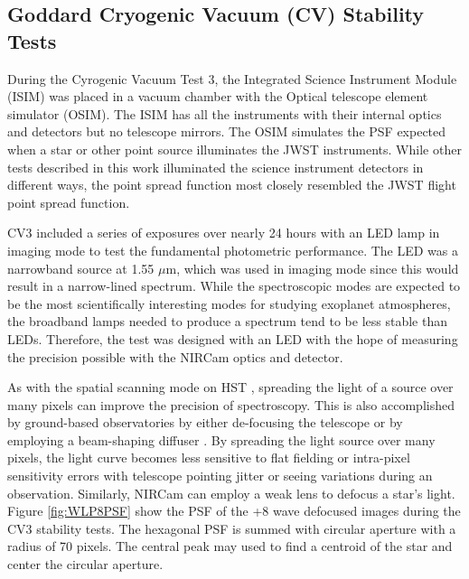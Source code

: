 \documentclass{aastex62}
\begin{document}
\subsection{Goddard Cryogenic Vacuum (CV) Stability Tests}

During the Cyrogenic Vacuum Test 3, the Integrated Science Instrument Module (ISIM) was placed in a vacuum chamber with the Optical telescope element simulator (OSIM).
The ISIM has all the instruments with their internal optics and detectors but no telescope mirrors.
The OSIM simulates the PSF expected when a star or other point source illuminates the JWST instruments.
While other tests described in this work illuminated the science instrument detectors in different ways, the point spread function most closely resembled the JWST flight point spread function.

CV3 included a series of exposures over nearly 24 hours with an LED lamp in imaging mode to test the fundamental photometric performance.
The LED was a narrowband source at 1.55 $\mu$m, which was used in imaging mode since this would result in a narrow-lined spectrum.
While the spectroscopic modes are expected to be the most scientifically interesting modes for studying exoplanet atmospheres, the broadband lamps needed to produce a spectrum tend to be less stable than LEDs.
Therefore, the test was designed with an LED with the hope of measuring the precision possible with the NIRCam optics and detector.

As with the spatial scanning mode on HST \citep[e.g.][]{mccullough2012spatialScan,deming13}, spreading the light of a source over many pixels can improve the precision of spectroscopy.
This is also accomplished by ground-based observatories by either de-focusing the telescope \citep{southworth2009defocusing} or by employing a beam-shaping diffuser \citep{stefansson2017diffusers}.
By spreading the light source over many pixels, the light curve becomes less sensitive to flat fielding or intra-pixel sensitivity errors with telescope pointing jitter or seeing variations during an observation.
Similarly, NIRCam can employ a weak lens to defocus a star's light.
Figure \ref{fig:WLP8PSF} show the PSF of the +8 wave defocused images during the CV3 stability tests.
The hexagonal PSF is summed with circular aperture with a radius of 70 pixels.
The central peak may used to find a centroid of the star and center the circular aperture.
\end{document}
